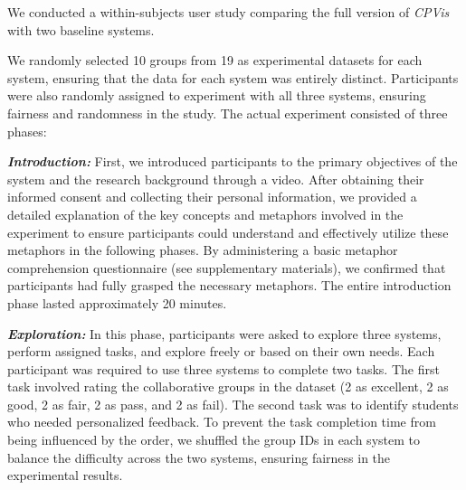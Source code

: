 We conducted a within-subjects user study comparing the full version of \textit{CPVis} with two baseline systems. 


We randomly selected 10 groups from 19 as experimental datasets for each system, ensuring that the data for each system was entirely distinct.
Participants were also randomly assigned to experiment with all three systems, ensuring fairness and randomness in the study.
The actual experiment consisted of three phases:

\textbf{\textit{Introduction:}} First, we introduced participants to the primary objectives of the system and the research background through a video. After obtaining their informed consent and collecting their personal information, we provided a detailed explanation of the key concepts and metaphors involved in the experiment to ensure participants could understand and effectively utilize these metaphors in the following phases. By administering a basic metaphor comprehension questionnaire (see supplementary materials), we confirmed that participants had fully grasped the necessary metaphors. The entire introduction phase lasted approximately 20 minutes.

\textbf{\textit{Exploration:}} In this phase, participants were asked to explore three systems, perform assigned tasks, and explore freely or based on their own needs. Each participant was required to use three systems to complete two tasks. The first task involved rating the collaborative groups in the dataset (2 as excellent, 2 as good, 2 as fair, 2 as pass, and 2 as fail). The second task was to identify students who needed personalized feedback. To prevent the task completion time from being influenced by the order, we shuffled the group IDs in each system to balance the difficulty across the two systems, ensuring fairness in the experimental results.


